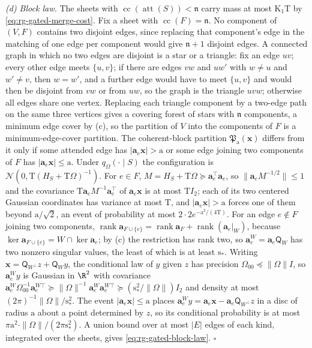 \emph{(d) Block law.} The sheets with
\(\operatorname{cc}(\operatorname{att}(S))<\mathfrak n\) carry mass at most
\(\mathrm K_1\mathrm T\) by \cref{eq:rg-gated-merge-cost}. Fix a sheet with
\(\operatorname{cc}(F)=\mathfrak n\). No component of \((V,F)\) contains
two disjoint edges, since replacing that component's edge in the matching of
one edge per component would give \(\mathfrak n+1\) disjoint edges. A
connected graph in which no two edges are disjoint is a star or a triangle:
fix an edge \(uv\); every other edge meets \(\{u,v\}\); if there are edges
\(vw\) and \(uw'\) with \(w\ne u\) and \(w'\ne v\), then \(w=w'\), and a
further edge would have to meet \(\{u,v\}\) and would then be disjoint from
\(vw\) or from \(uw\), so the graph is the triangle \(uvw\); otherwise all
edges share one vertex. Replacing each triangle component by a two-edge path
on the same three vertices gives a covering forest of stars with
\(\mathfrak n\) components, a minimum edge cover by (c), so the partition
of \(V\) into the components of \(F\) is a minimum-edge-cover partition.
The coherent-block partition \(\mathfrak P_{\mathrm a}(\mathbf x)\) differs
from it only if some attended edge has \(|\mathbf a_e\mathbf x|>\mathrm a\) or
some edge joining two components of \(F\) has
\(|\mathbf a_e\mathbf x|\le\mathrm a\). Under \(q_\Omega(\cdot\mid S)\) the
configuration is \(\mathcal N(0,\mathrm T(H_S+\mathrm T\Omega)^{-1})\). For
\(e\in F\), \(M=H_S+\mathrm T\Omega\succeq\mathbf a_e^\top\mathbf a_e\), so
\(\|\mathbf a_eM^{-1/2}\|\le1\) and the covariance
\(\mathrm T\mathbf a_eM^{-1}\mathbf a_e^\top\) of \(\mathbf a_e\mathbf x\) is at
most \(\mathrm TI_2\); each of its two centered Gaussian coordinates has
variance at most \(\mathrm T\), and \(|\mathbf a_e\mathbf x|>\mathrm a\)
forces one of them beyond \(\mathrm a/\sqrt2\), an event of probability at
most \(2\cdot2e^{-\mathrm a^2/(4\mathrm T)}\). For an edge \(e\notin F\)
joining two components, \(\operatorname{rank}\mathbf a_{F\cup\{e\}}
=\operatorname{rank}\mathbf a_F+\operatorname{rank}(\mathbf a_e|_{W})\),
because \(\ker\mathbf a_{F\cup\{e\}}=W\cap\ker\mathbf a_e\); by (c) the
restriction has rank two, so \(\mathbf a^W_e=\mathbf a_e\mathsf Q_W\) has two nonzero
singular values, the least of which is at least \(\mathrm s_*\). Writing
\(\mathbf x=\mathsf Q_{W^\perp}z+\mathsf Q_Wy\), the conditional law of \(y\)
given \(z\) has precision \(\Omega_{00}\preceq\|\Omega\|I\), so \(\mathbf a^W_ey\) is
Gaussian in \(\R^2\) with covariance
\(\mathbf a^W_e\Omega_{00}^{-1}\mathbf a^{W\top}_e\succeq\|\Omega\|^{-1}\mathbf a^W_e\mathbf a^{W\top}_e\succeq(\mathrm s_*^2/\|\Omega\|)I_2\)
and density at most \((2\pi)^{-1}\|\Omega\|/\mathrm s_*^2\). The event
\(|\mathbf a_e\mathbf x|\le\mathrm a\) places \(\mathbf a^W_ey=\mathbf a_e\mathbf x-\mathbf a_e\mathsf Q_{W^\perp}z\)
in a disc of radius \(\mathrm a\) about a point determined by \(z\), so its
conditional probability is at most \(\pi\mathrm a^2\cdot\|\Omega\|/(2\pi\mathrm s_*^2)\).
A union bound over at most \(|E|\) edges of each kind, integrated over the
sheets, gives \cref{eq:rg-gated-block-law}. \(\square\)


